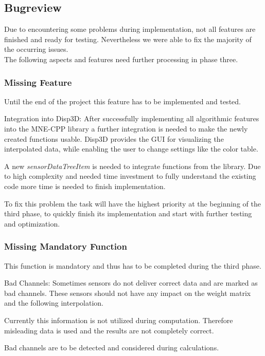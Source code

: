 \subsection{Bugreview}
Due to encountering some problems during implementation, not all features are finished and ready for testing.
Nevertheless we were able to fix the majority of the occurring issues. \\ 
The following aspects and features need further processing in phase three. 

\subsubsection{Missing Feature}
Until the end of the project this feature has to be implemented and tested.

\begin{aims}
	\item[\hspace*{11mm} Integration into Disp3D:] After successfully implementing all algorithmic features into the MNE-CPP library a further integration is needed to make the newly created functions usable. Disp3D provides the GUI for visualizing the interpolated data, while enabling the user to change settings like the color table.
	
	A new \textit{sensorDataTreeItem} is needed to integrate functions from the library. Due to high complexity and needed time investment to fully understand the existing code more time is needed to finish implementation.
	
	To fix this problem the task will have the highest priority at the beginning of the third phase, to quickly finish its implementation and start with further testing and optimization. 
	
	
\end{aims}

\subsubsection{Missing Mandatory Function}
This function is mandatory and thus has to be completed during the third phase.

\begin{aims}
	\item[\hspace*{11mm} Bad Channels:]Sometimes sensors do not deliver correct data and are marked as bad channels. These sensors should not have                          					   any impact on the weight matrix and the following interpolation. 
	
					   Currently this information is not utilized during computation. Therefore misleading data is used and the 							   results are not completely correct.  
					  
					   Bad channels are to be detected and considered during calculations. 
\end{aims}

